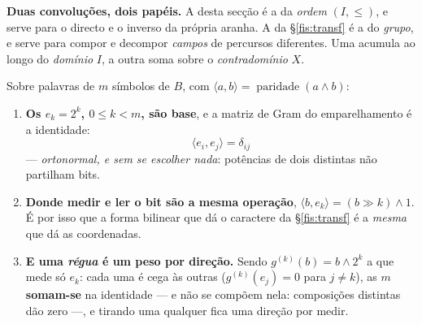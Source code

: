 \documentclass[livro.tex]{subfiles}
\begin{document}
\medskip\noindent\textbf{Duas convoluções, dois papéis.} A desta secção é a da
\emph{ordem} $(I,\le)$, e serve para o directo e o inverso da própria aranha. A
da §\ref{fis:transf} é a do \emph{grupo}, e serve para compor e decompor
\emph{campos} de percursos diferentes. Uma acumula ao longo do \emph{domínio}
$I$, a outra soma sobre o \emph{contradomínio} $X$.


\begin{teorema}\label{fis:thm:base}
Sobre palavras de $m$ símbolos de $B$, com $\langle a,b\rangle=\operatorname{paridade}(a\wedge b)$:
\begin{enumerate}\itemsep3pt
\item[(1)] \textbf{Os $e_k=2^{k}$, $0\le k<m$, são base}, e a matriz de Gram do
emparelhamento é a identidade:
\[
\boxed{\;\langle e_i,e_j\rangle=\delta_{ij}\;}
\]
--- \emph{ortonormal, e sem se escolher nada}: potências de dois distintas não
partilham bits.
\item[(2)] \textbf{Donde medir e ler o bit são a mesma operação},
$\langle b,e_k\rangle=(b\gg k)\wedge 1$. É por isso que a forma bilinear que dá o
caractere da §\ref{fis:transf} é a \emph{mesma} que dá as coordenadas.
\item[(3)] \textbf{E uma \emph{régua} é um peso por direção.} Sendo
$g^{(k)}(b)=b\wedge 2^{k}$ a que mede só $e_k$: cada uma é cega às outras
($g^{(k)}(e_j)=0$ para $j\neq k$), as $m$ \textbf{somam-se} na identidade --- e
não se compõem nela: composições distintas dão zero ---, e tirando uma qualquer
fica uma direção por medir.
\end{enumerate}
\end{teorema}
\end{document}
